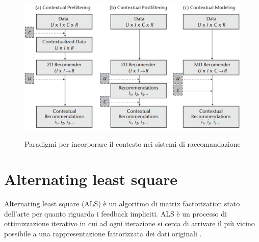 \begin{figure}
  \centering
  \includegraphics[width=\linewidth]{immagini/paradigm_for_context_inclusion.png}
  \caption{Paradigmi per incorporare il contesto nei sistemi di raccomandazione}
  \cite{context-paradigm}
  \label{fig:context-paradigm}
\end{figure}

\section{Alternating least square}
Alternating least square (ALS) \cite{als} è un algoritmo di matrix factorization stato dell'arte per quanto riguarda i feedback impliciti. ALS è un processo di ottimizzazione iterativo in cui ad ogni iterazione si cerca di arrivare il più vicino possibile a una rappresentazione fattorizzata dei dati originali \cite{als-medium}. 

